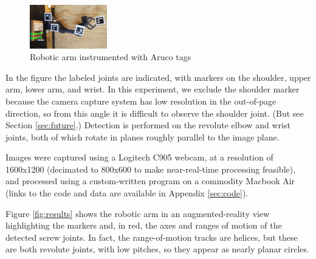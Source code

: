 \documentclass[letterpaper, 10 pt, conference]{ieeeconf}  %
\begin{document}
\begin{figure}[ht]
  \centering
  \includegraphics[width=0.3\textwidth]{img/arm.png}
  \caption{Robotic arm instrumented with Aruco tags}
  \label{fig:arm}
\end{figure}

In the figure the labeled joints are indicated, with markers on the shoulder, upper arm, lower arm, and wrist. In this experiment, we exclude the shoulder marker because the camera capture system has low resolution in the out-of-page direction, so from this angle it is difficult to observe the shoulder joint. (But see Section \ref{sec:future}.) Detection is performed on the revolute elbow and wrist joints, both of which rotate in planes roughly parallel to the image plane.

Images were captured using a Logitech C905 webcam, at a resolution of 1600x1200 (decimated to 800x600 to make near-real-time processing feasible), and processed using a custom-written program on a commodity Macbook Air (links to the code and data are available in Appendix \ref{sec:code}).

Figure \ref{fig:results} shows the robotic arm in an augmented-reality view highlighting the markers and, in red, the axes and ranges of motion of the detected screw joints. In fact, the range-of-motion tracks are helices, but these are both revolute joints, with low pitches, so they appear as nearly planar circles.
\end{document}
